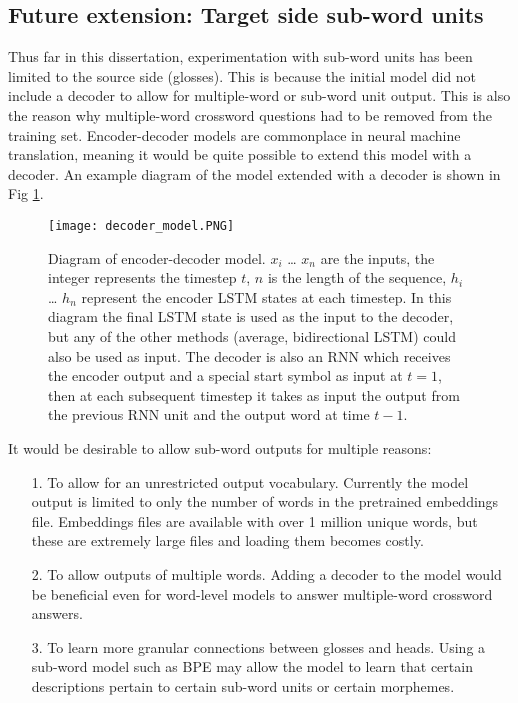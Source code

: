 \documentclass[11pt]{article}
\begin{document}
\begin{spacing}{1}
\section{Future extension: Target side sub-word units}
Thus far in this dissertation, experimentation with sub-word units has been limited to the source side (glosses). This is because the initial model did not include a decoder to allow for multiple-word or sub-word unit output. This is also the reason why multiple-word crossword questions had to be removed from the training set. Encoder-decoder models are commonplace in neural machine translation, meaning it would be quite possible to extend this model with a decoder. An example diagram of the model extended with a decoder is shown in Fig \ref{decoder_model}.

\begin{figure}[!htpb]
\centering
\texttt{[image: decoder\_model.PNG]}
\caption{Diagram of encoder-decoder model.
$x_i$ … $x_n$ are the inputs, the integer represents the timestep $t$, $n$ is the length of the sequence, $h_i$ … $h_n$ represent the encoder LSTM states at each timestep. In this diagram the final LSTM state is used as the input to the decoder, but any of the other methods (average, bidirectional LSTM) could also be used as input. The decoder is also an RNN which receives the encoder output and a special start symbol as input at $t=1$, then at each subsequent timestep it takes as input the output from the previous RNN unit and the output word at time $t-1$.}
\label{decoder_model}
\end{figure}


It would be desirable to allow sub-word outputs for multiple reasons:
\begin{itemize}
\item[1.] To allow for an unrestricted output vocabulary. Currently the model output is limited to only the number of words in the pretrained embeddings file. Embeddings files are available with over 1 million unique words, but these are extremely large files and loading them becomes costly.
\item[2.] To allow outputs of multiple words. Adding a decoder to the model would be beneficial even for word-level models to answer multiple-word crossword answers.
\item[3.] To learn more granular connections between glosses and heads. Using a sub-word model such as BPE may allow the model to learn that certain descriptions pertain to certain sub-word units or certain morphemes. 
\end{itemize}


\end{spacing}
\end{document}
